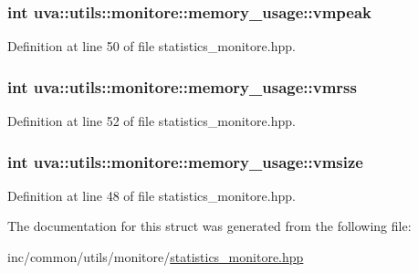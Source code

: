 \subsubsection[{vmpeak}]{\setlength{\rightskip}{0pt plus 5cm}int uva\+::utils\+::monitore\+::memory\+\_\+usage\+::vmpeak}\label{structuva_1_1utils_1_1monitore_1_1memory__usage_a2e46654655bb58a02ec3f7d028dac05a}


Definition at line 50 of file statistics\+\_\+monitore.\+hpp.

\hypertarget{structuva_1_1utils_1_1monitore_1_1memory__usage_ae885e502d2a99d1cce2f80a36a612dff}{}
\subsubsection[{vmrss}]{\setlength{\rightskip}{0pt plus 5cm}int uva\+::utils\+::monitore\+::memory\+\_\+usage\+::vmrss}\label{structuva_1_1utils_1_1monitore_1_1memory__usage_ae885e502d2a99d1cce2f80a36a612dff}


Definition at line 52 of file statistics\+\_\+monitore.\+hpp.

\hypertarget{structuva_1_1utils_1_1monitore_1_1memory__usage_a2585fdae114453629672e93a8eb8142c}{}
\subsubsection[{vmsize}]{\setlength{\rightskip}{0pt plus 5cm}int uva\+::utils\+::monitore\+::memory\+\_\+usage\+::vmsize}\label{structuva_1_1utils_1_1monitore_1_1memory__usage_a2585fdae114453629672e93a8eb8142c}


Definition at line 48 of file statistics\+\_\+monitore.\+hpp.



The documentation for this struct was generated from the following file\+:\begin{DoxyCompactItemize}
\item 
inc/common/utils/monitore/\hyperlink{statistics__monitore_8hpp}{statistics\+\_\+monitore.\+hpp}\end{DoxyCompactItemize}
